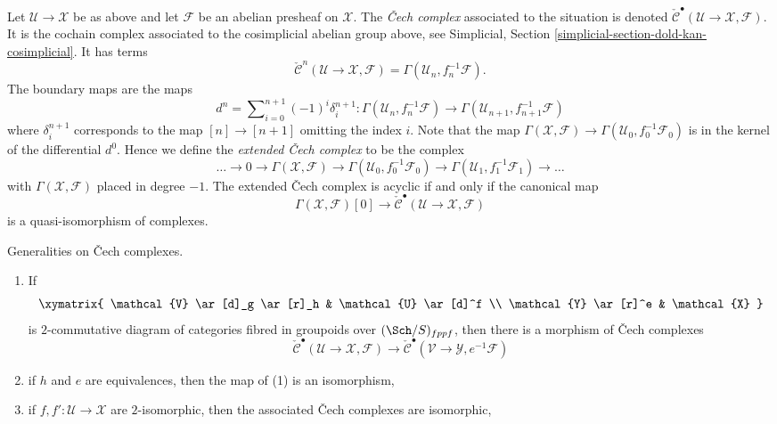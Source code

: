 \medskip\noindent
Let $\mathcal{U} \to \mathcal{X}$ be as above and let $\mathcal{F}$
be an abelian presheaf on $\mathcal{X}$.
The {\it {\v C}ech complex} associated to the situation is denoted
$\check{\mathcal{C}}^\bullet(\mathcal{U} \to \mathcal{X}, \mathcal{F})$.
It is the cochain complex associated to the cosimplicial abelian group
above, see
Simplicial, Section \ref{simplicial-section-dold-kan-cosimplicial}.
It has terms
$$
\check{\mathcal{C}}^n(\mathcal{U} \to \mathcal{X}, \mathcal{F})
= \Gamma(\mathcal{U}_n, f_n^{-1}\mathcal{F}).
$$
The boundary maps are the maps
$$
d^n = \sum\nolimits_{i = 0}^{n + 1} (-1)^i \delta^{n + 1}_i :
\Gamma(\mathcal{U}_n, f_n^{-1}\mathcal{F})
\longrightarrow
\Gamma(\mathcal{U}_{n + 1}, f_{n + 1}^{-1}\mathcal{F})
$$
where $\delta^{n + 1}_i$ corresponds to the map
$[n] \to [n + 1]$ omitting the index $i$. Note that the map
$\Gamma(\mathcal{X}, \mathcal{F}) \to
\Gamma(\mathcal{U}_0, f_0^{-1}\mathcal{F}_0)$
is in the kernel of the differential $d^0$. Hence we define
the {\it extended {\v C}ech complex} to be the complex
$$
\ldots \to 0 \to
\Gamma(\mathcal{X}, \mathcal{F}) \to
\Gamma(\mathcal{U}_0, f_0^{-1}\mathcal{F}_0) \to
\Gamma(\mathcal{U}_1, f_1^{-1}\mathcal{F}_1) \to \ldots
$$
with $\Gamma(\mathcal{X}, \mathcal{F})$ placed in degree $-1$.
The extended {\v C}ech complex is acyclic if and only if the canonical map
$$
\Gamma(\mathcal{X}, \mathcal{F})[0]
\longrightarrow
\check{\mathcal{C}}^\bullet(\mathcal{U} \to \mathcal{X}, \mathcal{F})
$$
is a quasi-isomorphism of complexes.

\begin{lemma}
\label{lemma-generalities}
Generalities on {\v C}ech complexes.
\begin{enumerate}
\item If
$$
\xymatrix{
\mathcal{V} \ar[d]_g \ar[r]_h & \mathcal{U} \ar[d]^f \\
\mathcal{Y} \ar[r]^e & \mathcal{X}
}
$$
is $2$-commutative diagram of categories fibred in groupoids over
$(\Sch/S)_{fppf}$, then there is a morphism of {\v C}ech complexes
$$
\check{\mathcal{C}}^\bullet(\mathcal{U} \to \mathcal{X}, \mathcal{F})
\longrightarrow
\check{\mathcal{C}}^\bullet(\mathcal{V} \to \mathcal{Y}, e^{-1}\mathcal{F})
$$
\item if $h$ and $e$ are equivalences, then the map of (1) is an isomorphism,
\item if $f, f' : \mathcal{U} \to \mathcal{X}$ are $2$-isomorphic, then
the associated {\v C}ech complexes are isomorphic,
\end{enumerate}
\end{lemma}

